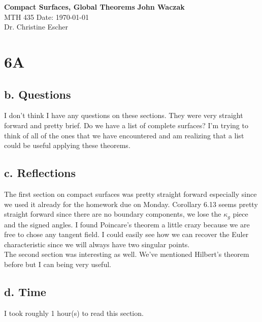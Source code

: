 \documentclass[a4paper, 11pt]{article}
\begin{document}
\noindent
\large\textbf{Compact Surfaces, Global Theorems} \hfill \textbf{John Waczak} \\
\normalsize MTH 435 \hfill  Date: \today \\
Dr. Christine Escher \\

\section*{6A}
\subsection*{b. Questions}
		I don't think I have any questions on these sections. They were very straight forward and pretty brief. Do we have a list of complete surfaces? I'm trying to think of all of the ones that we have encountered and am realizing that a list could be useful applying these theorems. 
	
\subsection*{c. Reflections}
		The first section on compact surfaces was pretty straight forward especially since we used it already for the homework due on Monday. Corollary 6.13 seems pretty straight forward since there are no boundary components, we lose the $\kappa_g$ piece and the signed angles. I found Poincare's theorem a little crazy because we are free to chose any tangent field. I could easily see how we can recover the  Euler characteristic since we will always have two singular points. \\
		
		\noindent The second section was interesting as well. We've mentioned Hilbert's theorem before but I can being very useful. 
\subsection*{d. Time}
I took roughly 1 hour(s) to read this section. 
\end{document}

